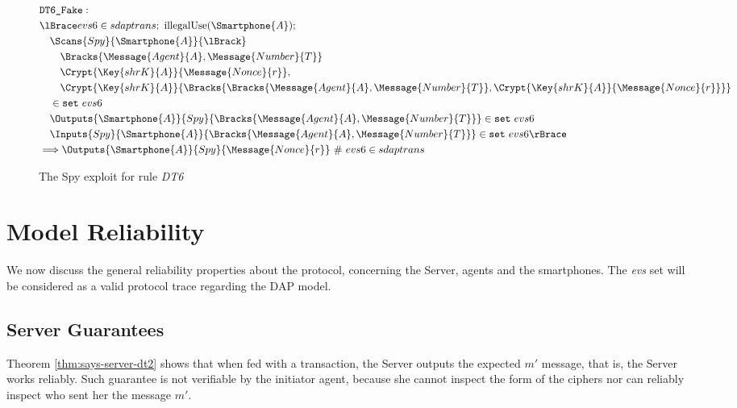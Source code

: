 \begin{figure}[!h]
  \begin{align*}
    & \texttt{DT6\_Fake}: \\
    & \lBrace evs6 \in sdaptrans;\ \text{illegalUse}(\Smartphone{A}); \\
    & \quad \Scans{Spy}{\Smartphone{A}}{\lBrack} \\
    & \qquad \Bracks{\Message{Agent}{A}, \Message{Number}{T}} \\
    & \qquad \Crypt{\Key{shrK}{A}}{\Message{Nonce}{r}}, \\
    & \qquad \Crypt{\Key{shrK}{A}}{\Bracks{\Bracks{\Message{Agent}{A}, \Message{Number}{T}}, \Crypt{\Key{shrK}{A}}{\Message{Nonce}{r}}}} \\
    & \quad \in \texttt{set} \ evs6 \\
    & \quad \Outputs{\Smartphone{A}}{Spy}{\Bracks{\Message{Agent}{A}, \Message{Number}{T}}} \in \texttt{set} \ evs6 \\
    & \quad \Inputs{Spy}{\Smartphone{A}}{\Bracks{\Message{Agent}{A}, \Message{Number}{T}}} \in \texttt{set} \ evs6 \rBrace \\ 
    & \Longrightarrow \Outputs{\Smartphone{A}}{Spy}{\Message{Nonce}{r}} \ \# \ evs6 \in sdaptrans
  \end{align*}
  \label{fig:dap-model-threat-dt6}
  \caption{The Spy exploit for rule \textit{DT6}}
\end{figure}



\section{Model Reliability}
We now discuss the general reliability properties about the protocol, concerning the Server, agents and the smartphones. The \textit{evs} set will be considered as a valid protocol trace regarding the DAP model.


\subsection{Server Guarantees}
Theorem \ref{thm:says-server-dt2} shows that when fed with a transaction, the Server outputs the expected \(m'\) message, that is, the Server works reliably. Such guarantee is not verifiable by the initiator agent, because she cannot inspect the form of the ciphers nor can reliably inspect who sent her the message \(m'\).

